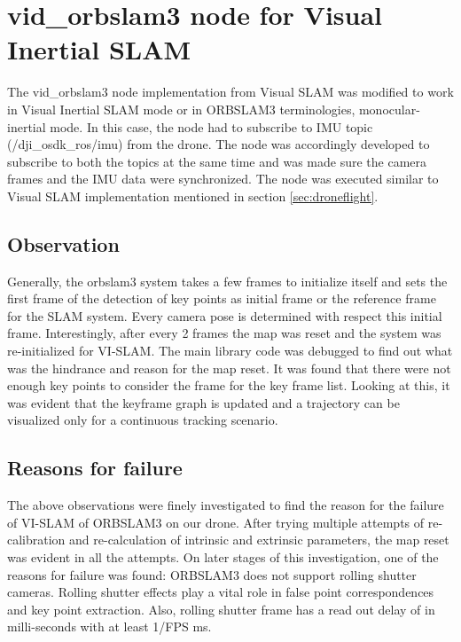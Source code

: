 \section{vid\_orbslam3 node for Visual Inertial SLAM}
\label{sec:vidorbslam3VI-SLAM}
The vid\_orbslam3 node implementation from Visual SLAM was modified to work in Visual Inertial SLAM mode or in ORBSLAM3 terminologies, monocular-inertial mode. In this case, the node had to subscribe to IMU topic (/dji\_osdk\_ros/imu) from the drone. The node was accordingly developed to subscribe to both the topics at the same time and was made sure the camera frames and the IMU data were synchronized. The node was executed similar to Visual SLAM implementation mentioned in section \ref{sec:droneflight}. 

\subsection*{Observation}
Generally, the orbslam3 system takes a few frames to initialize itself and sets the first frame of the detection of key points as initial frame or the reference frame for the SLAM system. Every camera pose is determined with respect this initial frame. Interestingly, after every 2 frames the map was reset and the system was re-initialized for VI-SLAM. The main library code was debugged to find out what was the hindrance and reason for the map reset. It was found that there were not enough key points to consider the frame for the key frame list. Looking at this, it was evident that the keyframe graph is updated and a trajectory can be visualized only for a continuous tracking scenario.

\subsection*{Reasons for failure}
\label{subsec:reasonforfailure}
The above observations were finely investigated to find the reason for the failure of VI-SLAM of ORBSLAM3 on our drone. After trying multiple attempts of re-calibration and re-calculation of intrinsic and extrinsic parameters, the map reset was evident in all the attempts. On later stages of this investigation, one of the reasons for failure was found: ORBSLAM3 does not support rolling shutter cameras. Rolling shutter effects play a vital role in false point correspondences and key point extraction. Also, rolling shutter frame has a read out delay of in milli-seconds with at least 1/FPS ms. \\


